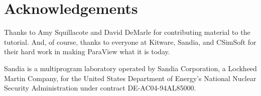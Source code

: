 \documentclass[@GLOBAL_OPTIONS@]{book}
\begin{document}
\tableofcontents

\listofexercise

\mainmatter











\backmatter

\chapter{Acknowledgements}

Thanks to Amy Squillacote and David DeMarle for contributing material to
the tutorial.  And, of course, thanks to everyone at Kitware, Sandia, and
CSimSoft for their hard work in making ParaView what it is today.

Sandia is a multiprogram laboratory operated by Sandia Corporation, a
Lockheed Martin Company, for the United States Department of Energy's
National Nuclear Security Administration under contract DE-AC04-94AL85000.

\clearpage
{}
{}
\printindex
\end{document}
